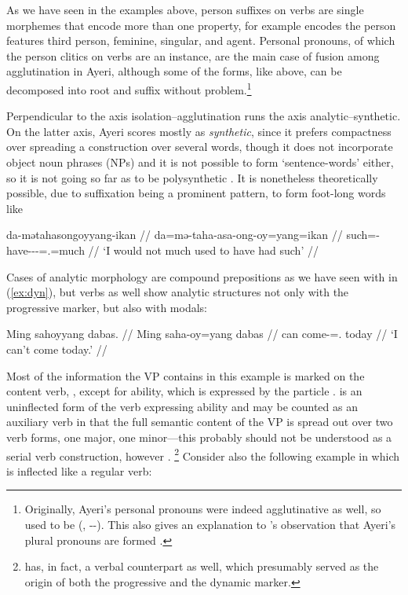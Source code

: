 As we have seen in the examples above, person suffixes on verbs are single 
morphemes that encode more than one property, for example  
encodes the person features third person, feminine, singular, and agent. 
Personal pronouns, of which the person clitics on 
verbs are an instance, are the main case of fusion among agglutination in 
Ayeri, although some of the forms, like  above, can 
be decomposed into root and suffix without problem.\footnote{Originally, 
Ayeri's personal pronouns were indeed agglutinative as well, so 
 used to be  (, 
\Tsg{}-\F{}-\Aarg{}). This also gives an explanation to \citet{boga2016}'s 
observation that Ayeri's plural pronouns are formed .}

Perpendicular to the axis isolation–agglutination runs the axis 
analytic–syn\-thetic. On the latter axis, Ayeri scores mostly as 
\emph{synthetic}, since it prefers compactness over spreading a construction 
over several words, though it does not incorporate object noun phrases (NPs) 
and it is not possible to form `sentence-words' either, so it is not going so 
far as to be poly\-syn\-thetic \citep[45--46]{comrie1989}. It is nonetheless 
theoretically possible, due to suffixation being a prominent pattern, to form 
foot-long words like

\ex\label{ex:footlong}\begingl
	\gla da-mətahasongoyyang-ikan //
	\glb da=mə-taha-asa-ong-oy=yang=ikan //
	\glc such=\Pst{}-have-\Hab{}-\Irr{}-\Neg{}=\Fsg{}.\Aarg{}=much //
	\glft `I would not much used to have had such' //
\endgl\xe

Cases of analytic morphology are compound prepositions as we have seen 
with  in (\ref{ex:dyn}), but verbs as well 
show analytic structures not only with the progressive marker, but also with 
modals:

\ex\begingl
	\gla Ming sahoyyang dabas. //
	\glb Ming saha-oy=yang dabas //
	\glc can come-\Neg{}=\Fsg{}.\Aarg{} today //
	\glft `I can't come today.' //
\endgl\xe

Most of the information the VP contains in this example is marked on the
content verb, , except for ability, which is expressed
by the particle .  is an uninflected
form of the verb expressing ability and may be counted as an auxiliary verb in
that the full semantic content of the VP is spread out over two verb forms, one
major, one minor---this probably should not be understood as a serial verb
construction, however \citep{aikhenvald2006}.%
\footnote{ has, in fact, a verbal counterpart 
 as well, which presumably served as the 
origin of both the progressive and the dynamic marker.\label{fn:mangaverb}}
Consider also the following example in which  is inflected
like a regular verb:

